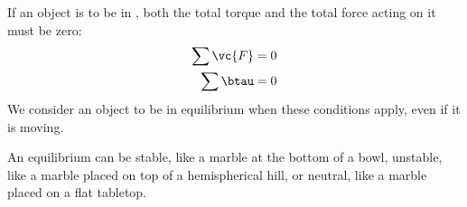 If an object is to be in , both the total torque and the total force acting on
it must be zero:
\begin{align*}
  \sum \vc{F} &= 0 \\
  \sum \btau &= 0 
\end{align*}
We consider an object to be in equilibrium when these conditions apply, even if it is
moving.

An equilibrium can be stable, like a marble at the bottom of a bowl, unstable,
like a marble placed on top of a hemispherical hill, or neutral, like a marble
placed on a flat tabletop.
